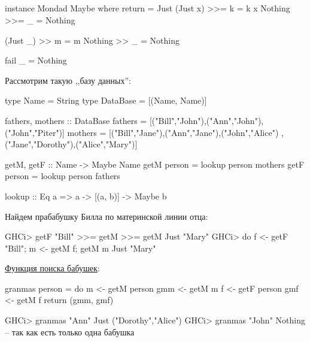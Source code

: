 \documentclass[11pt,a4paper]{article}
\begin{document}
\subsection{}
\begin{hscode}
instance Mondad Maybe where 
	return = Just
	(Just x) >>= k = k x
	Nothing >>= _ = Nothing

	(Just _) >> m = m
	Nothing >> _ = Nothing

	fail _ = Nothing
\end{hscode}
Рассмотрим такую ,,базу данных'':
\begin{hscode}
type Name = String
type DataBase = [(Name, Name)]

fathers, mothers :: DataBase
fathers =
	[("Bill","John"),("Ann","John"),("John","Piter")]
mothers =
	[("Bill","Jane"),("Ann","Jane"),("John","Alice") ,("Jane","Dorothy"),("Alice","Mary")]

getM, getF :: Name -> Maybe Name
getM person = lookup person mothers
getF person = lookup person fathers

lookup :: Eq a => a -> [(a, b)] -> Maybe b
\end{hscode}
Найдем прабабушку Билла по материнской линии отца:
\begin{hscode}
GHCi> getF "Bill" >>= getM >>= getM
Just "Mary"
GHCi> do { f <- getF "Bill"; m <- getM f; getM m }
Just "Mary"
\end{hscode}
\underline{Функция поиска бабушек}:
\begin{hscode}
granmas person = do
	m <- getM person
	gmm <- getM m
	f <- getF person
	gmf <- getM f
	return (gmm, gmf)

GHCi> granmas "Ann"
Just ("Dorothy","Alice")
GHCi> granmas "John"
Nothing  -- так как есть только одна бабушка
\end{hscode}
\end{document}
